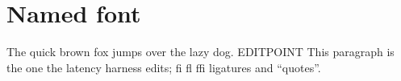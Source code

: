 \documentclass{article}
\begin{document}
\section{Named font}
The quick brown fox jumps over the lazy dog. EDITPOINT This paragraph is the
one the latency harness edits; fi fl ffi ligatures and “quotes”.
\end{document}
